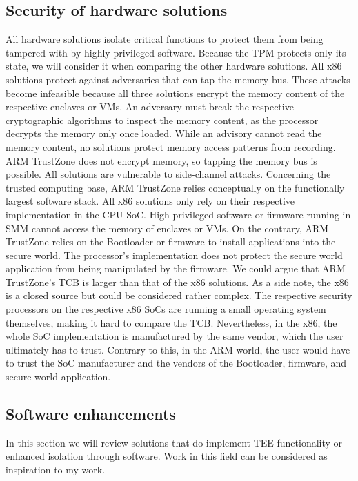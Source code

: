 \subsection{Security of hardware solutions}
All hardware solutions isolate critical functions to protect them from being tampered with by highly
privileged software. Because the TPM protects only its state, we will consider it when comparing the other hardware
solutions. All x86 solutions protect against adversaries that can tap the memory bus. These attacks become infeasible
because all three solutions encrypt the memory content of the respective enclaves or VMs. An adversary must break the
respective cryptographic algorithms to inspect the memory content, as the processor decrypts the memory only once
loaded. While an advisory cannot read the memory content, no solutions protect memory access patterns from recording.
ARM TrustZone does not encrypt memory, so tapping the memory bus is possible. All solutions are vulnerable to
side-channel attacks. Concerning the trusted computing base, ARM TrustZone relies conceptually on the functionally
largest software stack. All x86 solutions only rely on their respective implementation in the CPU SoC. High-privileged
software or firmware running in SMM cannot access the memory of enclaves or VMs. On the contrary, ARM TrustZone
relies on the Bootloader or firmware to install applications into the secure world. The processor's implementation does
not protect the secure world application from being manipulated by the firmware. We could argue that ARM TrustZone's TCB
is larger than that of the x86 solutions. As a side note, the x86 is a closed source but could be considered rather
complex. The respective security processors on the respective x86 SoCs are running a small operating system themselves,
making it hard to compare the TCB. Nevertheless, in the x86, the whole SoC implementation is manufactured by the same
vendor, which the user ultimately has to trust. Contrary to this, in the ARM world, the user would have to trust the
SoC manufacturer and the vendors of the Bootloader, firmware, and secure world application.

\subsection{Software enhancements}
In this section we will review solutions that do implement TEE functionality or enhanced isolation through software.
Work in this field can be considered as inspiration to my work.

